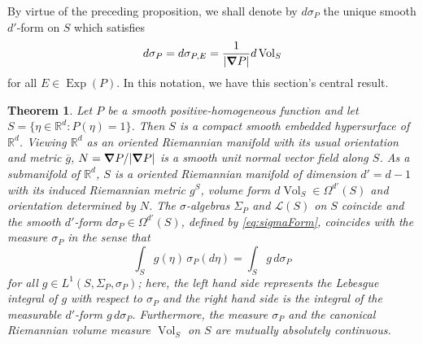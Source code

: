 \documentclass[11pt]{article}
\newtheorem{theorem}{Theorem}[section]
\newcommand\Exp{\operatorname{Exp}}
\newcommand{\Vol}{\operatorname{Vol}}
\begin{document}
\noindent By virtue of the preceding proposition, we shall denote by $d\sigma_P$ the unique smooth $d'$-form on $S$ which satisfies
\begin{equation}\label{eq:sigmaForm}
    d\sigma_P=d\sigma_{P,E}=\frac{1}{|\grad P|}d\Vol_S
\end{equation}
for all $E\in\Exp(P)$. In this notation, we have this section's central result.




\begin{theorem}\label{thm:RiemannLebesgue}
Let $P$ be a smooth positive-homogeneous function and let $S=\{\eta\in\mathbb{R}^d:P(\eta)=1\}$. Then $S$ is a compact smooth embedded hypersurface of $\mathbb{R}^d$. Viewing $\mathbb{R}^d$ as an oriented Riemannian manifold with its usual orientation and metric $\overline{g}$, $N=\grad P/|\grad P|$ is a smooth unit normal vector field along $S$. As a submanifold of $\mathbb{R}^d$, $S$ is a oriented Riemannian manifold of dimension $d'=d-1$ with its induced Riemannian metric $g^S$, volume form $d\Vol_S\in\Omega^{d'}(S)$ and orientation determined by $N$. The $\sigma$-algebras $\Sigma_P$ and $\mathcal{L}(S)$ on $S$ coincide and the smooth $d'$-form $d\sigma_P\in\Omega^{d'}(S)$, defined by \eqref{eq:sigmaForm}, coincides with the measure $\sigma_P$ in the sense that
\begin{equation}\label{eq:FormsAndMeasures}
\int_S g(\eta)\,\sigma_P(d\eta)=\int_S g\,d\sigma_P
\end{equation}
for all $g\in L^1(S,\Sigma_P,\sigma_P)$; here, the left hand side represents the Lebesgue integral of $g$ with respect to $\sigma_P$ and the right hand side is the integral of the measurable $d'$-form $g\, d\sigma_P$. Furthermore, the measure $\sigma_P$ and the canonical Riemannian volume measure $\Vol_S$ on $S$ are mutually absolutely continuous.
\end{theorem} 
\end{document}
